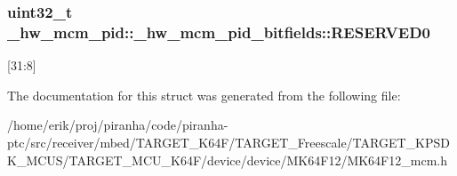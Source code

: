 \subsubsection[{\texorpdfstring{R\+E\+S\+E\+R\+V\+E\+D0}{RESERVED0}}]{\setlength{\rightskip}{0pt plus 5cm}uint32\+\_\+t \+\_\+hw\+\_\+mcm\+\_\+pid\+::\+\_\+hw\+\_\+mcm\+\_\+pid\+\_\+bitfields\+::\+R\+E\+S\+E\+R\+V\+E\+D0}\hypertarget{struct__hw__mcm__pid_1_1__hw__mcm__pid__bitfields_a9d1be3ab5bae5bbbaaa93d271d923338}{}\label{struct__hw__mcm__pid_1_1__hw__mcm__pid__bitfields_a9d1be3ab5bae5bbbaaa93d271d923338}
\mbox{[}31\+:8\mbox{]} 

The documentation for this struct was generated from the following file\+:\begin{DoxyCompactItemize}
\item 
/home/erik/proj/piranha/code/piranha-\/ptc/src/receiver/mbed/\+T\+A\+R\+G\+E\+T\+\_\+\+K64\+F/\+T\+A\+R\+G\+E\+T\+\_\+\+Freescale/\+T\+A\+R\+G\+E\+T\+\_\+\+K\+P\+S\+D\+K\+\_\+\+M\+C\+U\+S/\+T\+A\+R\+G\+E\+T\+\_\+\+M\+C\+U\+\_\+\+K64\+F/device/device/\+M\+K64\+F12/M\+K64\+F12\+\_\+mcm.\+h\end{DoxyCompactItemize}
